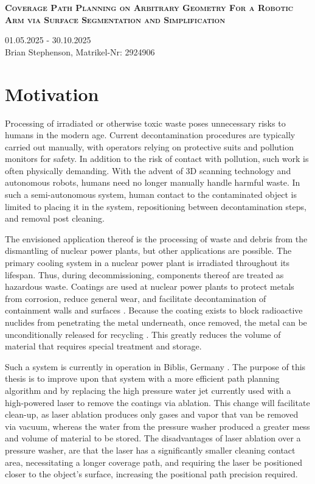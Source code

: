 \documentclass[a4paper, 10pt]{article}
\begin{document}
	
\begin{center}
	\fontsize{21pt}{10pt}\selectfont
	\textsc{\textbf{Coverage Path Planning on Arbitrary Geometry For a Robotic Arm via Surface Segmentation and Simplification}}
\end{center}
\begin{center}
	01.05.2025 - 30.10.2025 \\
	Brian Stephenson, Matrikel-Nr: 2924906
\end{center}

\section*{Motivation}
Processing of irradiated or otherwise toxic waste poses unnecessary risks to humans in the modern age.
Current decontamination procedures are typically carried out manually, with operators relying on protective suits and pollution monitors for safety.
In addition to the risk of contact with pollution, such work is often physically demanding.
With the advent of 3D scanning technology and autonomous robots, humans need no longer manually handle harmful waste.
In such a semi-autonomous system, human contact to the contaminated object is limited to placing it in the system, repositioning between decontamination steps, and removal post cleaning.

The envisioned application thereof is the processing of waste and debris from the dismantling of nuclear power plants, but other applications are possible.
The primary cooling system in a nuclear power plant is irradiated throughout its lifespan.
Thus, during decommissioning, components thereof are treated as hazardous waste.
Coatings are used at nuclear power plants to protect metals from corrosion, reduce general wear, and facilitate decontamination of containment walls and surfaces \cite{NRC_coatings}.
Because the coating exists to block radioactive nuclides from penetrating the metal underneath, once removed, the metal can be unconditionally released for recycling \cite{NRC_coatings}.
This greatly reduces the volume of material that requires special treatment and storage.

Such a system is currently in operation in Biblis, Germany \cite{ROBBE}.
The purpose of this thesis is to improve upon that system with a more efficient path planning algorithm and by replacing the high pressure water jet currently used with a high-powered laser to remove the coatings via ablation.
This change will facilitate clean-up, as laser ablation produces only gases and vapor that van be removed via vacuum, whereas the water from the pressure washer produced a greater mess and volume of material to be stored.
The disadvantages of laser ablation over a pressure washer, are that the laser has a significantly smaller cleaning contact area, necessitating a longer coverage path, and requiring the laser be positioned closer to the object's surface, increasing the positional path precision required.
\end{document}
